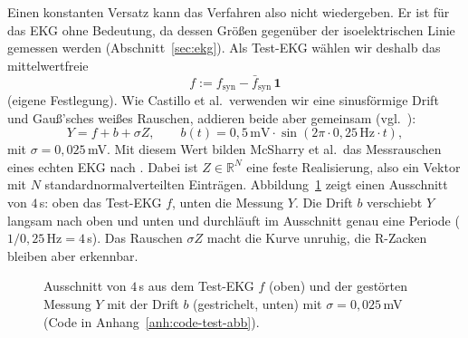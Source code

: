 \documentclass[a4paper,11pt,bibliography=totoc,listof=totoc,headinclude=true,cleardoublepage=empty,oneside]{scrbook}
\theoremstyle{plain}
\theoremstyle{definition}
\newcommand{\R}{\mathbb{R}}
\begin{document}
Einen konstanten Versatz kann das Verfahren also nicht wiedergeben. Er ist
für das EKG ohne Bedeutung, da dessen Grö\ss en gegenüber der isoelektrischen
Linie gemessen werden (Abschnitt~\ref{sec:ekg}). Als Test-EKG wählen wir
deshalb das mittelwertfreie
\[
  f := f_{\mathrm{syn}} - \bar f_{\mathrm{syn}}\,\mathbf 1
\]
(eigene Festlegung). Wie Castillo et al.\ verwenden wir eine sinusförmige
Drift und Gau\ss 'sches wei\ss es Rauschen, addieren beide aber gemeinsam
(vgl.\ \cite[Abschn.~4]{castillo}): %
\[
  Y = f + b + \sigma Z, \qquad b(t) = 0{,}5\,\mathrm{mV}\cdot\sin(2\pi\cdot 0{,}25\,\mathrm{Hz}\cdot t),
\]
mit $\sigma = 0{,}025$\,mV. Mit diesem Wert bilden McSharry et al.\ das
Messrauschen eines echten EKG nach \cite[Abschn.~V]{mcsharry}. %
Dabei ist $Z\in\R^N$ eine feste
Realisierung, also ein Vektor mit $N$ standardnormalverteilten Einträgen.
Abbildung~\ref{fig:testsignal} zeigt einen Ausschnitt von $4$\,s: oben das
Test-EKG $f$, unten die Messung $Y$. Die Drift $b$ verschiebt $Y$ langsam
nach oben und unten und durchläuft im Ausschnitt genau eine Periode
($1/0{,}25\,\mathrm{Hz} = 4$\,s). Das Rauschen $\sigma Z$ macht die Kurve
unruhig, die R-Zacken bleiben aber erkennbar.

\begin{figure}[htbp]
  \centering
  \caption[Test-EKG und gestörte Messung]{Ausschnitt von $4$\,s aus dem
  Test-EKG $f$ (oben) und der gestörten Messung $Y$ mit der Drift $b$
  (gestrichelt, unten) mit $\sigma = 0{,}025$\,mV (Code in
  Anhang~\ref{anh:code-test-abb}).}
  \label{fig:testsignal}
\end{figure}
\end{document}
